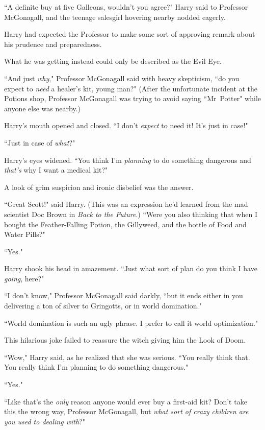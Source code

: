 ``A definite buy at five Galleons, wouldn't you agree?" Harry said to Professor McGonagall, and the teenage salesgirl hovering nearby nodded eagerly.

Harry had expected the Professor to make some sort of approving remark about his prudence and preparedness.

What he was getting instead could only be described as the Evil Eye.

``And just \emph{why}," Professor McGonagall said with heavy skepticism, ``do you expect to \emph{need} a healer's kit, young man?" (After the unfortunate incident at the Potions shop, Professor McGonagall was trying to avoid saying ``Mr~Potter" while anyone else was nearby.)

Harry's mouth opened and closed. ``I don't \emph{expect} to need it! It's just in case!"

``Just in case of \emph{what}?"

Harry's eyes widened. ``You think I'm \emph{planning} to do something dangerous and \emph{that's} why I want a medical kit?"

A look of grim suspicion and ironic disbelief was the answer.

``Great Scott!" said Harry. (This was an expression he'd learned from the mad scientist Doc Brown in \emph{Back to the Future}.) ``Were you also thinking that when I bought the Feather-Falling Potion, the Gillyweed, and the bottle of Food and Water Pills?"

``Yes."

Harry shook his head in amazement. ``Just what sort of plan do you think I have \emph{going}, here?"

``I don't know," Professor McGonagall said darkly, ``but it ends either in you delivering a ton of silver to Gringotts, or in world domination."

``World domination is such an ugly phrase. I prefer to call it world optimization."

This hilarious joke failed to reassure the witch giving him the Look of Doom.

``Wow," Harry said, as he realized that she was serious. ``You really think that. You really think I'm planning to do something dangerous."

``Yes."

``Like that's the \emph{only} reason anyone would ever buy a first-aid kit? Don't take this the wrong way, Professor McGonagall, but \emph{what sort of crazy children are you used to dealing with}?"

